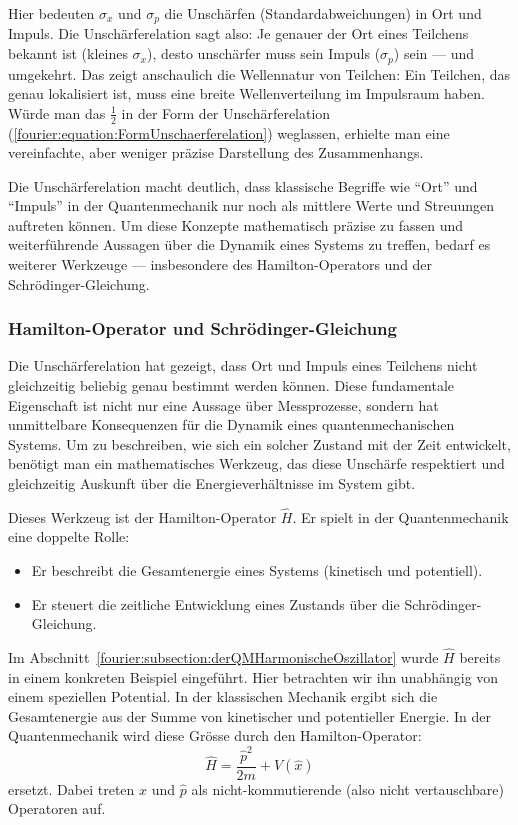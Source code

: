 		Hier bedeuten $\sigma_x$ und $\sigma_p$ die Unschärfen (Standardabweichungen) in Ort und Impuls.
		Die Unschärferelation sagt also:
		Je genauer der Ort eines Teilchens bekannt ist (kleines $\sigma_x$), desto unschärfer muss sein Impuls ($\sigma_p$) sein --- und umgekehrt.
		Das zeigt anschaulich die Wellennatur von Teilchen:
		Ein Teilchen, das genau lokalisiert ist, muss eine breite Wellenverteilung im Impulsraum haben.
		Würde man das $\tfrac{1}{2}$ in der Form der Unschärferelation (\ref{fourier:equation:FormUnschaerferelation}) weglassen, erhielte man eine vereinfachte, aber weniger präzise Darstellung des Zusammenhangs.

		Die Unschärferelation macht deutlich, dass klassische Begriffe wie ``Ort'' und ``Impuls'' in der Quantenmechanik nur noch als mittlere Werte und Streuungen auftreten können.
		Um diese Konzepte mathematisch präzise zu fassen und weiterführende Aussagen über die Dynamik eines Systems zu treffen, bedarf es weiterer Werkzeuge ---
		insbesondere des Hamilton-Operators und der Schrödinger-Gleichung.

	\subsubsection{Hamilton-Operator und Schrödinger-Gleichung%
	\label{fourier:subsubsection:hamiltonOperatorUndSchroedinger}}
		Die Unschärferelation hat gezeigt, dass Ort und Impuls eines Teilchens nicht gleichzeitig beliebig genau bestimmt werden können.
		Diese fundamentale Eigenschaft ist nicht nur eine Aussage über Messprozesse,
		sondern hat unmittelbare Konsequenzen für die Dynamik eines quantenmechanischen Systems.
		Um zu beschreiben, wie sich ein solcher Zustand mit der Zeit entwickelt,
		benötigt man ein mathematisches Werkzeug, das diese Unschärfe respektiert
		und gleichzeitig Auskunft über die Energieverhältnisse im System gibt.
		
		Dieses Werkzeug ist der Hamilton-Operator \( \hat{H} \).
		Er spielt in der Quantenmechanik eine doppelte Rolle:
		\begin{itemize}
		\item Er beschreibt die Gesamtenergie eines Systems (kinetisch und potentiell).
		\item Er steuert die zeitliche Entwicklung eines Zustands über die Schrödinger-Gleichung.
		\end{itemize}
		Im Abschnitt~\ref{fourier:subsection:derQMHarmonischeOszillator} wurde $\hat{H}$ bereits in einem konkreten Beispiel eingeführt.
		Hier betrachten wir ihn unabhängig von einem speziellen Potential.
		In der klassischen Mechanik ergibt sich die Gesamtenergie aus der Summe von kinetischer und potentieller Energie.
		In der Quantenmechanik wird diese Grösse durch den Hamilton-Operator:
		\begin{equation}\label{fourier:equation:HamiltonOperatorQM}
			\hat{H} = \frac{\hat{p}^2}{2m} + V(\hat{x})
		\end{equation}
		ersetzt.
		Dabei treten $\hat{x}$ und $\hat{p}$ als nicht-kommutierende (also nicht vertauschbare) Operatoren auf.
		
